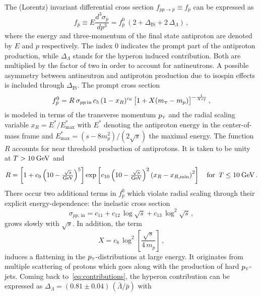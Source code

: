 \documentclass[a4paper,11pt]{article}
\newcommand{\eVdist}{\kern-0.06em}
\newcommand{\gev}{\:\text{Ge\eVdist V}}
\newcommand{\pt}{p_{\text{\tiny{T}}}}
\newcommand{\mt}{m_{\text{\tiny{T}}}}
\newcommand{\iso}{\ensuremath{\Delta_{\text{IS}}}}
\newcommand{\hyp}{\ensuremath{\Delta_{\Lambda}}}
\begin{document}
The (Lorentz) invariant differential cross section $f_{pp\rightarrow \bar{p}}\equiv f_{\bar{p}}$ can be expressed as
\begin{equation}\label{eq:contributions}
  f_{\bar{p}}\equiv E\frac{d^3\sigma_{\bar{p}}}{dp^3} = f_{\bar{p}}^0 \:( 2 + \iso + 2 \,\hyp)\,,
\end{equation}
where the energy and three-momentum of the final state antiproton are denoted by $E$ and $p$ respectively. The index $0$ indicates the prompt part of the antiproton production, while $\hyp$ stands for the hyperon induced contribution. Both are multiplied by the factor of two in order to account for antineutrons. A possible asymmetry between antineutron and antiproton production due to isospin effects is included through $\iso$. The prompt cross section
\begin{equation}\label{eq:tsallis}
 f_{\bar{p}}^0 = R \:\sigma_{pp\,\text{in}} \, c_5 \,(1-x_R)^{c_6} \,\big[1 + X (\mt - m_p)\big]^{-\frac{1}{X c_7}}\,,
\end{equation}
is modeled in terms of the transverse momentum $\pt$ and the radial scaling variable $x_R= E^*/E^*_{\text{max}}$ with $E^*$ denoting the antiproton energy in the center-of-mass frame and $E^*_{\text{max}}=(s-8 m_p^2)/(2\sqrt{s})$ the maximal energy. The function $R$ accounts for near threshold production of antiprotons. It is taken to be unity at $T>10\gev$ and 
\begin{equation}\label{eq:nearthreshold}
 R= \left[ 1 + c_9 \left( 10 - \tfrac{\sqrt{s}}{\text{GeV}}\right)^5\right] \exp\left[ c_{10} \left( 10 - \tfrac{\sqrt{s}}{\text{GeV}}\right)^2 \left(x_R- x_{R,\text{min}}\right)^2\right]\quad \text{for}\;\; T\leq 10\gev\,.
\end{equation}
There occur two additional terms in $f_{\bar{p}}^0$ which violate radial scaling through their explicit energy-dependence: the inelastic cross section
\begin{equation}\label{eq:inelasticpar}
 \sigma_{pp,\,\text{in}} = c_{11} + c_{12}\, \log{\sqrt{s}} + c_{13}\, \log^2{\sqrt{s}}\,,
\end{equation}
grows slowly with $\sqrt{s}$. In addition, the term
\begin{equation}\label{eq:X}
 X = c_8\, \log^2\left[\frac{\sqrt{s}}{4\,m_p}\right]\,,
\end{equation}
induces a flattening in the $\pt$-distributions at large energy. It originates from multiple scattering of protons which goes along with the production of hard $\pt$-jets. Coming back to~\eqref{eq:contributions}, the hyperon contribution can be expressed as $\hyp=(0.81\pm 0.04)\,(\bar{\Lambda}/\bar{p})$ with
\end{document}
